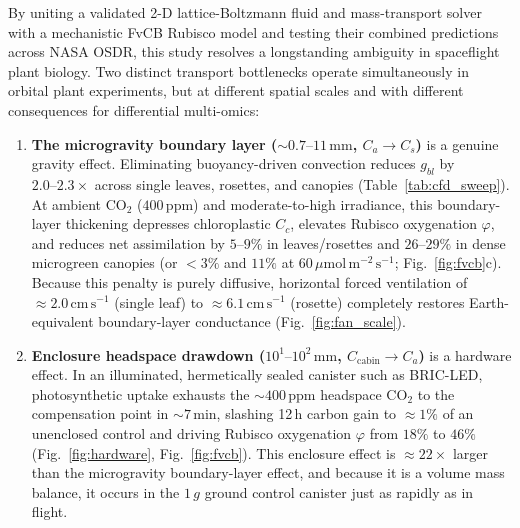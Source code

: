 \documentclass[final,5p,times,twocolumn,numbers,sort&compress]{elsarticle}
\newcommand{\ums}{\ensuremath{\mu\mathrm{mol\,m^{-2}\,s^{-1}}}}
\newcommand{\cmsu}{\ensuremath{\mathrm{cm\,s^{-1}}}}
\begin{document}
By uniting a validated 2-D lattice-Boltzmann fluid and mass-transport solver with a mechanistic FvCB Rubisco model and testing their combined predictions across NASA OSDR, this study resolves a longstanding ambiguity in spaceflight plant biology. Two distinct transport bottlenecks operate simultaneously in orbital plant experiments, but at different spatial scales and with different consequences for differential multi-omics:
\begin{enumerate}
    \item \textbf{The microgravity boundary layer ($\sim 0.7\text{--}11\,\mathrm{mm}$, $C_a \to C_s$)} is a genuine gravity effect. Eliminating buoyancy-driven convection reduces $g_{bl}$ by $2.0\text{--}2.3\times$ across single leaves, rosettes, and canopies (Table~\ref{tab:cfd_sweep}). At ambient $\mathrm{CO_2}$ ($400\,\mathrm{ppm}$) and moderate-to-high irradiance, this boundary-layer thickening depresses chloroplastic $C_c$, elevates Rubisco oxygenation $\varphi$, and reduces net assimilation by $5\text{--}9\%$ in leaves/rosettes and $26\text{--}29\%$ in dense microgreen canopies (or $<3\%$ and $11\%$ at $60\,\ums$; Fig.~\ref{fig:fvcb}c). Because this penalty is purely diffusive, horizontal forced ventilation of $\approx 2.0\,\cmsu$ (single leaf) to $\approx 6.1\,\cmsu$ (rosette) completely restores Earth-equivalent boundary-layer conductance (Fig.~\ref{fig:fan_scale}).
    \item \textbf{Enclosure headspace drawdown ($10^1\text{--}10^2\,\mathrm{mm}$, $C_{\text{cabin}} \to C_a$)} is a hardware effect. In an illuminated, hermetically sealed canister such as BRIC-LED, photosynthetic uptake exhausts the $\sim 400\,\mathrm{ppm}$ headspace $\mathrm{CO_2}$ to the compensation point in $\sim 7\,\mathrm{min}$, slashing 12\,h carbon gain to $\approx 1\%$ of an unenclosed control and driving Rubisco oxygenation $\varphi$ from $18\%$ to $46\%$ (Fig.~\ref{fig:hardware}, Fig.~\ref{fig:fvcb}). This enclosure effect is $\approx 22\times$ larger than the microgravity boundary-layer effect, and because it is a volume mass balance, it occurs in the $1\,g$ ground control canister just as rapidly as in flight.
\end{enumerate}
\end{document}
